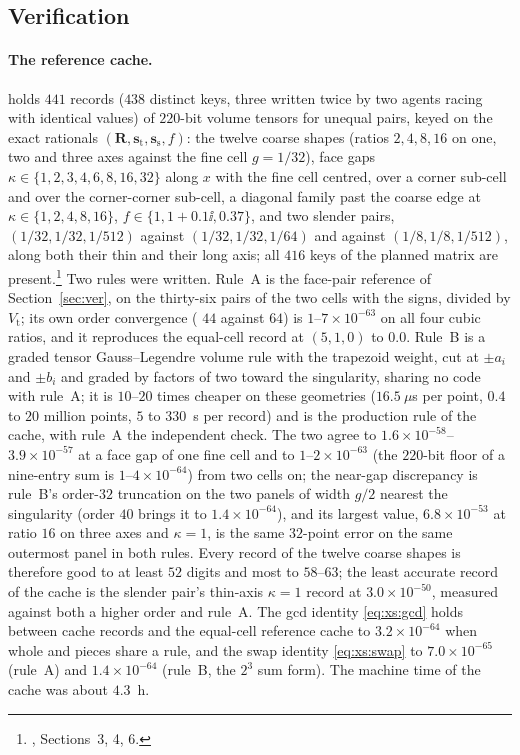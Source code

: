 \subsection{Verification}
\label{sec:xs:ver}

\paragraph{The reference cache.}
\label{sec:xs:ref}
 holds $441$ records ($438$ distinct keys, three
written twice by two agents racing with identical values) of $220$-bit volume tensors for
unequal pairs, keyed on the exact rationals $(\mathbf{R},\mathbf{s}_{\mathrm{t}},\mathbf{s}_{\mathrm{s}},f)$:
the twelve coarse shapes (ratios $2,4,8,16$ on one, two and three axes against the fine
cell $g = 1/32$), face gaps $\kappa\in\{1,2,3,4,6,8,16,32\}$ along $x$ with the fine cell
centred, over a corner sub-cell and over the corner-corner sub-cell, a diagonal family past
the coarse edge at $\kappa\in\{1,2,4,8,16\}$, $f\in\{1,1+0.1\ii,0.37\}$, and two slender
pairs, $(1/32,1/32,1/512)$ against $(1/32,1/32,1/64)$ and against $(1/8,1/8,1/512)$, along
both their thin and their long axis; all $416$ keys of the planned matrix are
present.\footnote{, Sections~3, 4, 6.} Two rules were
written. Rule~A is the face-pair reference of Section~\ref{sec:ver},  on the
thirty-six pairs of the two cells with the  signs, divided by
$V_{\mathrm{t}}$; its own order convergence ( $44$ against $64$) is
$1$--$7\times10^{-63}$ on all four cubic ratios, and it reproduces the equal-cell record at
$(5,1,0)$ to $0.0$. Rule~B is a graded tensor Gauss--Legendre volume rule with the trapezoid
weight, cut at $\pm a_i$ and $\pm b_i$ and graded by factors of two toward the singularity,
sharing no code with rule~A; it is $10$--$20$ times cheaper on these geometries
($16.5~\mu$s per point, $0.4$ to $20$ million points, $5$ to $330$~s per record) and is the
production rule of the cache, with rule~A the independent check. The two agree to
$1.6\times10^{-58}$--$3.9\times10^{-57}$ at a face gap of one fine cell and to
$1$--$2\times10^{-63}$ (the $220$-bit floor of a nine-entry sum is $1$--$4\times10^{-64}$)
from two cells on; the near-gap discrepancy is rule~B's order-$32$ truncation on the two
panels of width $g/2$ nearest the singularity (order $40$ brings it to $1.4\times10^{-64}$),
and its largest value, $6.8\times10^{-53}$ at ratio $16$ on three axes and $\kappa = 1$, is
the same $32$-point error on the same outermost panel in both rules. Every record of the
twelve coarse shapes is therefore good to at least $52$ digits and most to $58$--$63$; the
least accurate record of the cache is the slender pair's thin-axis $\kappa = 1$ record at
$3.0\times10^{-50}$, measured against both a higher order and rule~A. The gcd identity
\eqref{eq:xs:gcd} holds between cache records and the equal-cell reference cache to
$3.2\times10^{-64}$ when whole and pieces share a rule, and the swap identity
\eqref{eq:xs:swap} to $7.0\times10^{-65}$ (rule~A) and $1.4\times10^{-64}$ (rule~B, the
$2^3$ sum form). The machine time of the cache was about $4.3$~h.

